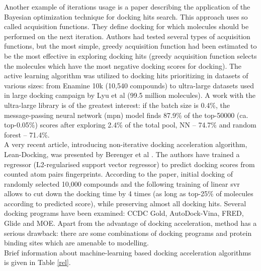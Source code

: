 Another example of iterations usage is a paper {\cite{Graff2021AcceleratingLearning}} describing the application of the Bayesian optimization technique for docking hits search.
This approach uses so called acquisition functions.
They define docking for which molecules should be performed on the next iteration.
Authors had tested several types of acquisition functions, but the most simple, greedy acquisition function had been estimated to be the most effective in exploring docking hits
(greedy acquisition function selects the molecules which have the most negative docking scores for docking).
The active learning algorithm was utilized to docking hits prioritizing in datasets of various sizes: from Enamine 10k (10,540 compounds) to ultra-large datasets used in large docking campaign {\cite{Lyu2019Ultra-largeChemotypes}} by Lyu et al (99.5 million molecules).
A work with the ultra-large library is of the greatest interest: if the batch size is 0.4\%, the message-passing neural network (\acrshort{mpn}) model finds 87.9\% of the top-50000 (ca. top-0.05\%) scores after exploring 2.4\% of the total pool, NN -- 74.7\% and random forest -- 71.4\%.\\

A very recent article, introducing non-iterative docking acceleration algorithm, Lean-Docking, was presented by Berenger et al {\cite{Berenger2021Lean-Docking:Docking}}. 
The authors have trained a regressor (L2-regularised support vector regressor) to predict docking scores from counted atom pairs fingerprints. 
According to the paper, initial docking of randomly selected 10,000 compounds and the following training of linear \acrshort{svr} allows to cut down the docking time by 4 times (as long as top-25\% of molecules according to predicted score), while preserving almost all docking hits. 
Several docking programs have been examined: CCDC Gold, AutoDock-Vina, FRED, Glide and MOE. 
Apart from the advantage of docking acceleration, method has a serious drawback: there are some combinations of docking programs and protein binding sites which are amenable to modelling.  \\


Brief information about machine-learning based docking acceleration algorithms is given in Table \ref{rel}.

